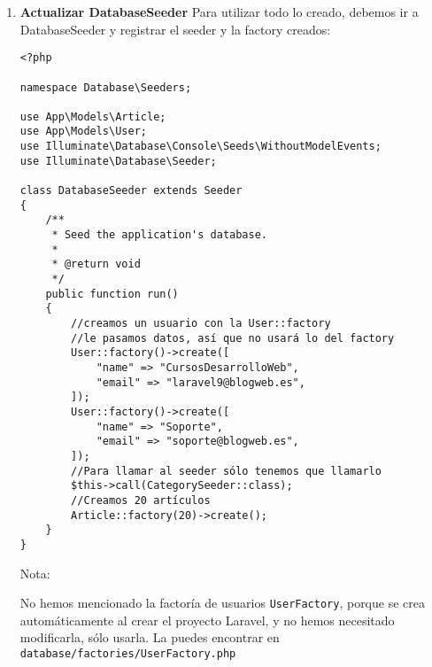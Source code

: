 \documentclass[11pt]{article}
\begin{document}
\begin{enumerate}
\begin{verbatim}
/**
 * @extends \Illuminate\Database\Eloquent\Factories\Factory<\App\Models\Article>
 */
class ArticleFactory extends Factory
{
    /**
     * Define the model's default state.
     *
     * @return array<string, mixed>
     */
    public function definition(): array
    {
        //introducimos los campos que queremos con su tip
        //los "faker" ya vienen dentro de los facotry
        //no hay que instanciarlos
        //
        return [
            //texto aleatorio de 30 caracteres
            "title" => $this->faker->text(30),
            //texto aleatorio para el "content"
            "content" => $this->faker->text,
            //obtenemos todos los usuarios que tenemos y asignamos
            //uno aleatoriamente
            "user_id" => User::all()->random(1)->first()->id,
            //idem con las categorías
            "category_id" => Category::all()->random(1)->first()->id,
            //hora de creación ahora con la función, de Carbon, now()
            "created_at" => now(),
        ];
    }
}
\end{verbatim}

\item \textbf{Actualizar DatabaseSeeder}
\label{sec:org956ecdc}
Para utilizar todo lo creado, debemos ir a DatabaseSeeder y registrar
el seeder y la factory creados:

\begin{verbatim}
<?php

namespace Database\Seeders;

use App\Models\Article;
use App\Models\User;
use Illuminate\Database\Console\Seeds\WithoutModelEvents;
use Illuminate\Database\Seeder;

class DatabaseSeeder extends Seeder
{
    /**
     * Seed the application's database.
     *
     * @return void
     */
    public function run()
    {
        //creamos un usuario con la User::factory
        //le pasamos datos, así que no usará lo del factory
        User::factory()->create([
            "name" => "CursosDesarrolloWeb",
            "email" => "laravel9@blogweb.es",
        ]);
        User::factory()->create([
            "name" => "Soporte",
            "email" => "soporte@blogweb.es",
        ]);
        //Para llamar al seeder sólo tenemos que llamarlo
        $this->call(CategorySeeder::class);
        //Creamos 20 artículos
        Article::factory(20)->create();
    }
}
\end{verbatim}

Nota:
\begin{mdframed}
No hemos mencionado la factoría de usuarios \texttt{UserFactory}, porque se
crea automáticamente al crear el proyecto Laravel, y no hemos
necesitado modificarla, sólo usarla. La puedes encontrar en
\texttt{database/factories/UserFactory.php}
\end{mdframed}



\end{enumerate}
\end{document}
